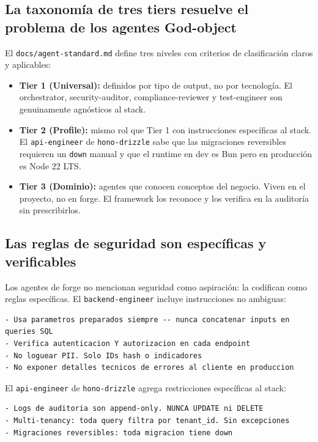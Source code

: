 \documentclass[12pt,a4paper]{article}
\begin{document}
\subsection{La taxonomía de tres tiers resuelve el problema de los agentes God-object}

El \texttt{docs/agent-standard.md} define tres niveles con criterios de clasificación
claros y aplicables:

\begin{itemize}
  \item \textbf{Tier 1 (Universal):} definidos por tipo de output, no por tecnología.
        El orchestrator, security-auditor, compliance-reviewer y test-engineer son
        genuinamente agnósticos al stack.
  \item \textbf{Tier 2 (Profile):} mismo rol que Tier 1 con instrucciones específicas
        al stack. El \texttt{api-engineer} de \texttt{hono-drizzle} sabe que las
        migraciones reversibles requieren un \texttt{down} manual y que el runtime
        en dev es Bun pero en producción es Node 22 LTS.
  \item \textbf{Tier 3 (Dominio):} agentes que conocen conceptos del negocio. Viven
        en el proyecto, no en forge. El framework los reconoce y los verifica en la
        auditoría sin prescribirlos.
\end{itemize}

\subsection{Las reglas de seguridad son específicas y verificables}

Los agentes de forge no mencionan seguridad como aspiración: la codifican como reglas
específicas. El \texttt{backend-engineer} incluye instrucciones no ambiguas:

\begin{lstlisting}[caption={Reglas de seguridad en backend-engineer.md}]
- Usa parametros preparados siempre -- nunca concatenar inputs en queries SQL
- Verifica autenticacion Y autorizacion en cada endpoint
- No loguear PII. Solo IDs hash o indicadores
- No exponer detalles tecnicos de errores al cliente en produccion
\end{lstlisting}

El \texttt{api-engineer} de \texttt{hono-drizzle} agrega restricciones específicas
al stack:

\begin{lstlisting}[caption={Reglas específicas de stack en api-engineer.md}]
- Logs de auditoria son append-only. NUNCA UPDATE ni DELETE
- Multi-tenancy: toda query filtra por tenant_id. Sin excepciones
- Migraciones reversibles: toda migracion tiene down
\end{lstlisting}
\end{document}
